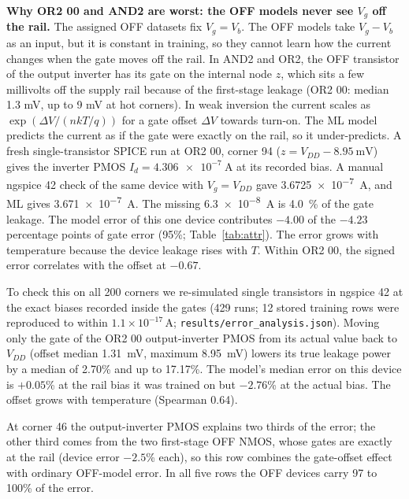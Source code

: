 

\textbf{Why OR2 00 and AND2 are worst: the OFF models never see $V_g$ off the rail.} The assigned OFF datasets fix $V_g=V_b$. The OFF models take $V_g-V_b$ as an input, but it is constant in training, so they cannot learn how the current changes when the gate moves off the rail. In AND2 and OR2, the OFF transistor of the output inverter has its gate on the internal node $z$, which sits a few millivolts off the supply rail because of the first-stage leakage (OR2 00: median 1.3 mV, up to 9 mV at hot corners). In weak inversion the current scales as $\exp(\Delta V/(nkT/q))$ for a gate offset $\Delta V$ towards turn-on. The ML model predicts the current as if the gate were exactly on the rail, so it under-predicts. A fresh single-transistor SPICE run at OR2 00, corner 94 ($z=V_{DD}-\SI{8.95}{\milli\volt}$) gives the inverter PMOS $I_d=\SI{4.306e-7}{\ampere}$ at its recorded bias. A manual ngspice 42 check of the same device with $V_g=V_{DD}$ gave \SI{3.6725e-7}{\ampere}, and ML gives \SI{3.671e-7}{\ampere}. The missing \SI{6.3e-8}{\ampere} is \SI{4.0}{\percent} of the gate leakage. The model error of this one device contributes $-4.00$ of the $-4.23$ percentage points of gate error (95\%; Table~\ref{tab:attr}). The error grows with temperature because the device leakage rises with $T$. Within OR2 00, the signed error correlates with the offset at $-0.67$.

To check this on all 200 corners we re-simulated single transistors in ngspice 42 at the exact biases recorded inside the gates (429 runs; 12 stored training rows were reproduced to within $1.1\times10^{-17}$\,A; \texttt{results/error\_analysis.json}). Moving only the gate of the OR2 00 output-inverter PMOS from its actual value back to $V_{DD}$ (offset median \SI{1.31}{\milli\volt}, maximum \SI{8.95}{\milli\volt}) lowers its true leakage power by a median of 2.70\% and up to 17.17\%. The model's median error on this device is $+0.05$\% at the rail bias it was trained on but $-2.76$\% at the actual bias. The offset grows with temperature (Spearman 0.64).



At corner 46 the output-inverter PMOS explains two thirds of the error; the other third comes from the two first-stage OFF NMOS, whose gates are exactly at the rail (device error $-2.5$\% each), so this row combines the gate-offset effect with ordinary OFF-model error. In all five rows the OFF devices carry 97 to 100\% of the error.

